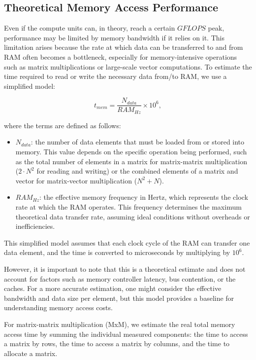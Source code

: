 \clearpage

\subsection*{Theoretical Memory Access Performance}

Even if the compute units can, in theory, reach a certain $GFLOPS$ peak, performance may be limited by memory bandwidth if it relies on it. This limitation arises because the rate at which data can be transferred to and from RAM often becomes a bottleneck, especially for memory-intensive operations such as matrix multiplications or large-scale vector computations. To estimate the time required to read or write the necessary data from/to RAM, we use a simplified model:

\begin{equation}
t_{mem} = \frac{N_{data}}{RAM_{Hz}} \times 10^6,
\end{equation}

where the terms are defined as follows:

\begin{itemize}
    \item $N_{data}$: the number of data elements that must be loaded from or stored into memory. This value depends on the specific operation being performed, such as the total number of elements in a matrix for matrix-matrix multiplication ($2 \cdot N^2$ for reading and writing) or the combined elements of a matrix and vector for matrix-vector multiplication ($N^2 + N$).
    \item $RAM_{Hz}$: the effective memory frequency in Hertz, which represents the clock rate at which the RAM operates. This frequency determines the maximum theoretical data transfer rate, assuming ideal conditions without overheads or inefficiencies.
\end{itemize}

This simplified model assumes that each clock cycle of the RAM can transfer one data element, and the time is converted to microseconds by multiplying by $10^6$.

However, it is important to note that this is a theoretical estimate and does not account for factors such as memory controller latency, bus contention, or the caches. For a more accurate estimation, one might consider the effective bandwidth and data size per element, but this model provides a baseline for understanding memory access costs.

For matrix-matrix multiplication (MxM), we estimate the real total memory access time by summing the individual measured components: the time to access a matrix by rows, the time to access a matrix by columns, and the time to allocate a matrix.

